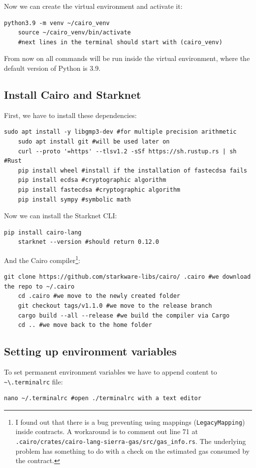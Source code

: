 \documentclass[11pt]{article}
\begin{document}
Now we can create the virtual environment and activate it:
\begin{lstlisting}[language=terminal]
    python3.9 -m venv ~/cairo_venv
    source ~/cairo_venv/bin/activate
    #next lines in the terminal should start with (cairo_venv)
\end{lstlisting}

From now on all commands will be run inside the virtual environment, where the default version of Python is 3.9.

\subsection{Install Cairo and Starknet}
First, we have to install these dependencies:
\begin{lstlisting}[language=terminal]
    sudo apt install -y libgmp3-dev #for multiple precision arithmetic
    sudo apt install git #will be used later on
    curl --proto '=https' --tlsv1.2 -sSf https://sh.rustup.rs | sh #Rust
    pip install wheel #install if the installation of fastecdsa fails
    pip install ecdsa #cryptographic algorithm
    pip install fastecdsa #cryptographic algorithm
    pip install sympy #symbolic math
\end{lstlisting}

Now we can install the Starknet CLI:
\begin{lstlisting}[language=terminal]
    pip install cairo-lang
    starknet --version #should return 0.12.0
\end{lstlisting}

And the Cairo compiler\footnote{I found out that there is a bug preventing using mappings (\verb|LegacyMapping|) inside contracts. A workaround is to comment out line 71 at \verb|.cairo/crates/cairo-lang-sierra-gas/src/gas_info.rs|. The underlying problem has something to do with a check on the estimated gas consumed by the contract.}:
\begin{lstlisting}[language=terminal]
    git clone https://github.com/starkware-libs/cairo/ .cairo #we download the repo to ~/.cairo
    cd .cairo #we move to the newly created folder
    git checkout tags/v1.1.0 #we move to the release branch
    cargo build --all --release #we build the compiler via Cargo
    cd .. #we move back to the home folder
\end{lstlisting}

\subsection{Setting up environment variables}
To set permanent environment variables we have to append content to \verb|~\.terminalrc| file:
\begin{lstlisting}[language=terminal]
    nano ~/.terminalrc #open ./terminalrc with a text editor
\end{lstlisting}
\end{document}
